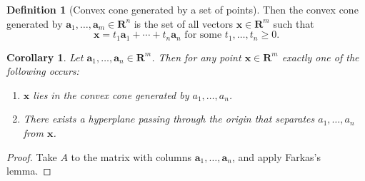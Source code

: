 \documentclass{amsbook}
\newcommand{\xx}{\mathbf x}
\renewcommand{\aa}{\mathbf a}
\newcommand{\RR}{\mathbf R}
\newtheorem{corollary}[theorem]{Corollary}
\theoremstyle{definition}
\newtheorem{definition}[theorem]{Definition}
\theoremstyle{remark}
\begin{document}
\begin{definition}
  [Convex cone generated by a set of points]
  Then the convex cone generated by $\aa_1,\dotsc,\aa_m\in \RR^n$ is the set of all vectors $\xx\in \RR^m$ such that
  \begin{displaymath}
    \xx = t_1\aa_1+\dotsb+t_n\aa_n \text{ for some }t_1,\dotsc,t_n\geq 0.
  \end{displaymath}
\end{definition}
\begin{corollary}
  Let $\aa_1,\dotsc,\aa_n\in \RR^m$.
  Then for any point $\xx\in \RR^m$ exactly one of the following occurs:
  \begin{enumerate}
  \item \label{item:3}
    $\xx$ lies in the convex cone generated by $a_1,\dotsc,a_n$.
  \item \label{item:4}
    There exists a hyperplane passing through the origin that separates $a_1,\dotsc,a_n$ from $\xx$.
  \end{enumerate}
\end{corollary}
\begin{proof}
  Take $A$ to the matrix with columns $\aa_1,\dotsc,\aa_n$, and apply Farkas's lemma.
\end{proof}


\end{document}
